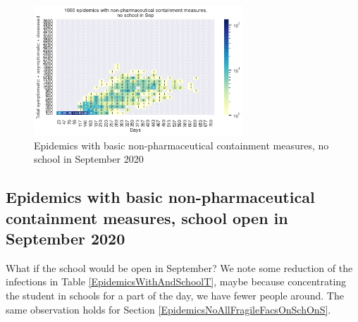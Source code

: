 \documentclass[11pt]{article}
\begin{document}
\begin{figure}[H]
\begin{center}
\includegraphics[width=0.7\textwidth]{HM30_readRunResults1k_withControl_plusHMlog.png}
\caption{Epidemics with basic non-pharmaceutical containment measures, no school in September 2020}
\label{EpidemicsWithAndNoSchoolHM}
\end{center}
\end{figure}




\subsection{Epidemics with basic non-pharmaceutical containment measures, school open in September 2020}
\label{EpidemicsWithAndSchoolS}


What if the school would be open in September? We note some reduction of the infections in Table \ref{EpidemicsWithAndSchoolT}, maybe because concentrating the student in schools for a part of the day, we have fewer people around. The same observation holds for Section \ref{EpidemicsNoAllFragileFacsOnSchOnS}.
\end{document}
